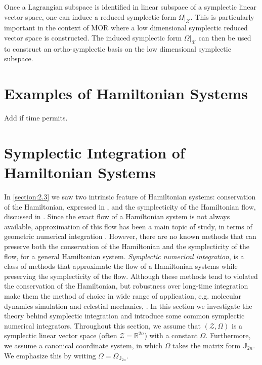 Once a Lagrangian subspace is identified in linear subspace of a symplectic linear vector space, one can induce a reduced symplectic form $\Omega|_{\mathcal X}$. This is particularly important in the context of MOR where a low dimensional symplectic reduced vector space is constructed. The induced symplectic form $\Omega|_{\mathcal X}$ can then be used to construct an ortho-symplectic basis on the low dimensional symplectic subspace.

\section{Examples of Hamiltonian Systems} Add if time permits.

\section{Symplectic Integration of Hamiltonian Systems}
In \cref{section:2.3} we saw two intrinsic feature of Hamiltonian systems: conservation of the Hamiltonian, expressed in , and the symplecticity of the Hamiltonian flow, discussed in . Since the exact flow of a Hamiltonian system is not always available, approximation of this flow has been a main topic of study, in terms of geometric numerical integration \cite{hairer2006geometric,blanes2016concise}. However, there are no known methods that can preserve both the conservation of the Hamiltonian and the symplecticity of the flow, for a general Hamiltonian system. \emph{Symplectic numerical integration}, is a class of methods that approximate the flow of a Hamiltonian systems while preserving the symplecticity of the flow. Although these methods tend to violated the conservation of the Hamiltonian, but robustness over long-time integration make them the method of choice in wide range of application, e.g. molecular dynamics simulation \cite{farantos2014nonlinear} and celestial mechanics, \cite{schutz2004statistical}. In this section we investigate the theory behind symplectic integration and introduce some common symplectic numerical integrators. Throughout this section, we assume that $(\mathcal Z, \Omega)$ is a symplectic linear vector space (often $\mathcal Z = \mathbb R^{2n}$) with a constant $\Omega$. Furthermore, we assume a canonical coordinate system, in which $\Omega$ takes the matrix form $\mathbb J_{2n}$. We emphasize this by writing $\Omega = \Omega_{\mathbb J_{2n}}$.

